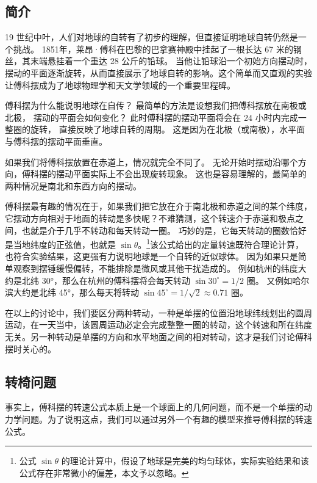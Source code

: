 
\begin{issues}
\end{issues}

\subsection{简介}
19 世纪中叶，人们对地球的自转有了初步的理解，但直接证明地球自转仍然是一个挑战。 1851年，莱昂·傅科在巴黎的巴拿赛神殿中挂起了一根长达 67 米的钢丝，其末端悬挂着一个重达 28 公斤的铅球。 当他让铅球沿一个初始方向摆动时，摆动的平面逐渐旋转，从而直接展示了地球自转的影响。这个简单而又直观的实验让傅科摆成为了地球物理学和天文学领域的一个重要里程碑。

傅科摆为什么能说明地球在自传？ 最简单的方法是设想我们把傅科摆放在南极或北极， 摆动的平面会如何变化？ 此时傅科摆的摆动平面将会在 24 小时内完成一整圈的旋转， 直接反映了地球自转的周期。 这是因为在北极（或南极），水平面与傅科摆的摆动平面垂直。

如果我们将傅科摆放置在赤道上，情况就完全不同了。 无论开始时摆动沿哪个方向，傅科摆的摆动平面实际上不会出现旋转现象。 这也是容易理解的，最简单的两种情况是南北和东西方向的摆动。

傅科摆最有趣的情况在于，如果我们把它放在介于南北极和赤道之间的某个纬度，它摆动方向相对于地面的转动是多快呢？不难猜测，这个转速介于赤道和极点之间，也就是介于几乎不转动和每天转动一圈。 巧妙的是，它每天转动的圈数恰好是当地纬度的正弦值，也就是 $\sin\theta$。\footnote{公式 $\sin\theta$ 的理论计算中，假设了地球是完美的均匀球体，实际实验结果和该公式存在非常微小的偏差，本文予以忽略。}该公式给出的定量转速既符合理论计算，也符合实验结果，这更强有力说明地球是一个自转的近似球体。 因为如果只是简单观察到摆锤缓慢偏转，不能排除是微风或其他干扰造成的。 例如杭州的纬度大约是北纬 30°，那么在杭州的傅科摆将会每天转动 $\sin 30^\circ = 1/2$ 圈。 又例如哈尔滨大约是北纬 45°，那么每天将转动 $\sin 45^\circ = 1/\sqrt{2}\approx 0.71$ 圈。

在以上的讨论中，我们要区分两种转动，一种是单摆的位置沿地球纬线划出的圆周运动，在一天当中，该圆周运动必定会完成整整一圈的转动，这个转速和所在纬度无关。另一种转动是单摆的方向和水平地面之间的相对转动，这才是我们讨论傅科摆时关心的。

\subsection{转椅问题}
事实上，傅科摆的转速公式本质上是一个球面上的几何问题，而不是一个单摆的动力学问题。为了说明这点，我们可以通过另外一个有趣的模型来推导傅科摆的转速公式。

